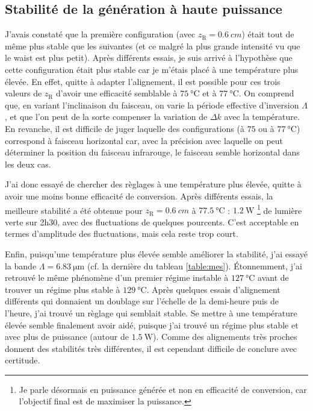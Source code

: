 \documentclass[11pt,a4paper] { article}
\newcommand{\zr}{z_\mathsc{R}}
\newcommand{\mathsc}[1]{\mathrm{\scriptscriptstyle {#1}}}
\begin{document}
\subsection{Stabilité de la génération à haute puissance}

J'avais constaté que la première configuration (avec $\zr=\SI{0.6}{cm}$) était tout de même plus stable que les suivantes (et ce malgré la plus grande intensité vu que le waist est plus petit). Après différents essais, je suis arrivé à l'hypothèse que cette configuration était plus stable car je m'étais placé à une température plus élevée. En effet, quitte à adapter l'alignement, il est possible pour ces trois valeurs de $\zr$ d'avoir une efficacité semblable à $\SI{75}{\celsius}$ et à $\SI{77}{\celsius}$. On comprend que, en variant l'inclinaison du faisceau, on varie la période effective d'inversion $\Lambda$, et que l'on peut de la sorte compenser la variation de $\Delta k$ avec la température. En revanche, il est difficile de juger laquelle des configurations (à $75$ ou à $\SI{77}{\celsius}$) correspond à faisceau horizontal car, avec la précision avec laquelle on peut déterminer la position du faisceau infrarouge, le faisceau semble horizontal dans les deux cas. 

J'ai donc essayé de chercher des règlages à une température plus élevée, quitte à avoir une moins bonne efficacité de conversion. Après différents essais, la meilleure stabilité a été obtenue pour $\zr=\SI{0.6}{cm}$ à $\SI{77.5}{\celsius}$ : $\SI{1.2}{\watt}$ \footnote{Je parle désormais en puissance générée et non en efficacité de conversion, car l'objectif final est de maximiser la puissance.} de lumière verte sur 2h30, avec des fluctuations de quelques pourcents. C'est acceptable en termes d'amplitude des fluctuations, mais cela reste trop court. 

Enfin, puisqu'une température plus élevée semble améliorer la stabilité, j'ai essayé la bande $\Lambda=\SI{6.83}{\micro\meter}$ (cf. la dernière du tableau \ref{table:mes}). Étonnemment, j'ai retrouvé le même phénomène d'un premier régime instable à $\SI{127}{\celsius}$ avant de trouver un régime plus stable à $\SI{129}{\celsius}$. Après quelques essais d'alignement différents qui donnaient un doublage sur l'échelle de la demi-heure puis de l'heure, j'ai trouvé un règlage qui semblait stable. Se mettre à une température élevée semble finalement avoir aidé, puisque j'ai trouvé un régime plus stable et avec plus de puissance (autour de $\SI{1.5}{\watt}$). Comme des alignements très proches donnent des stabilités très différentes, il est cependant difficile de conclure avec certitude.
\end{document}
